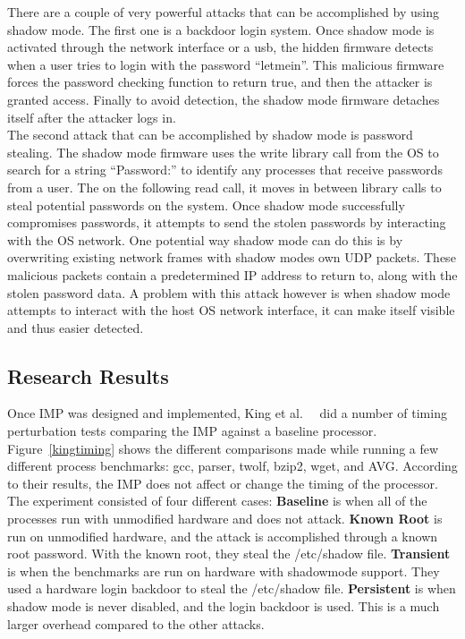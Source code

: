 \documentclass[letterpaper,twocolumn,11pt]{article}
\begin{document}
There are a couple of very powerful attacks that can be accomplished by using shadow mode. The first one is a backdoor login system. Once shadow mode is activated through the network interface or a usb, the hidden firmware detects when a user tries to login with the password ``letmein''. This malicious firmware forces the password checking function to return true, and then the attacker is granted access. Finally to avoid detection, the shadow mode firmware detaches itself after the attacker logs in.  \\

The second attack that can be accomplished by shadow mode is password stealing. The shadow mode firmware uses the write library call from the OS to search for a string ``Password:'' to identify any processes that receive passwords from a user. The on the following read call, it moves in between library calls to steal potential passwords on the system. Once shadow mode successfully compromises passwords, it attempts to send the stolen passwords by interacting with the OS network. One potential way shadow mode can do this is by overwriting existing network frames with shadow modes own UDP packets. These malicious packets contain a predetermined IP address to return to, along with the stolen password data. A problem with this attack however is when shadow mode attempts to interact with the host OS network interface, it can make itself visible and thus easier detected.

\subsection{Research Results}
Once IMP was designed and implemented, King et al.\ ~\cite {king} did a number of timing perturbation tests comparing the IMP against a baseline processor. Figure~\ref{kingtiming} shows the different comparisons made while running a few different process benchmarks: gcc, parser, twolf, bzip2, wget, and AVG. According to their results, the IMP does not affect or change the timing of the processor. The experiment consisted of four different cases: {\bf Baseline} is when all of the processes run with unmodified hardware and does not attack. {\bf Known Root} is run on unmodified hardware, and the attack is accomplished through a known root password. With the known root, they steal the /etc/shadow file. {\bf Transient} is when the benchmarks are run on hardware with shadowmode support. They used a hardware login backdoor to steal the /etc/shadow file. {\bf Persistent} is when shadow mode is never disabled, and the login backdoor is used. This is a much larger overhead compared to the other attacks. \\
\end{document}
